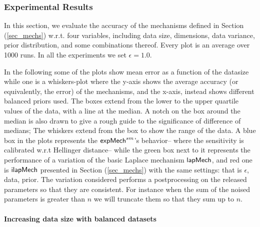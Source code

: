 \documentclass{article}
\begin{document}
\subsubsection{Experimental Results}
\label{subsec_vs_variables}

In this section, we evaluate the accuracy of the mechanisms defined in
Section (\ref{sec_mechs}) w.r.t. four variables, including data size, dimensions,
data variance, prior distribution, and some combinations thereof.
Every plot is an average over 1000 runs. In all the experiments we set
$\epsilon = 1.0$.

\noindent In the following some of the plots show
mean error as a function of the datasize while one
is a whiskers-plot where the y-axis shows the average
accuracy (or equivalently, the error) of the mechanisms, and the x-axis, instead shows
different balanced priors used. The boxes extend from the lower to the upper quartile values
of the data, with a line at the median. A notch on the box around the
median is also drawn to give a rough guide to the significance of
difference of medians; The whiskers extend from the box to show the
range of the data. A blue box in the plots represents the $\mathsf{expMech}^{sm}$'s behavior-- where the sensitivity is calibrated
w.r.t Hellinger distance-- while the green box next to
it represents the performance of a variation of the basic Laplace
mechanism $\mathsf{lapMech}$, and red one is $\mathsf{ilapMech}$ presented in Section (\ref{sec_mechs}) with the same
settings: that is $\epsilon$, data, prior. The variation
considered performs a postprocessing on the released parameters so
that they are consistent. For instance when the sum of the noised
parameters is greater than $n$ we will truncate them so that they sum
up to $n$.

\paragraph{Increasing data size with balanced datasets}
\label{subsubsec_vs_datasize}


\begin{figure}[ht]
\begin{center}
\centering
{}

\end{center}
\end{figure}
\end{document}
